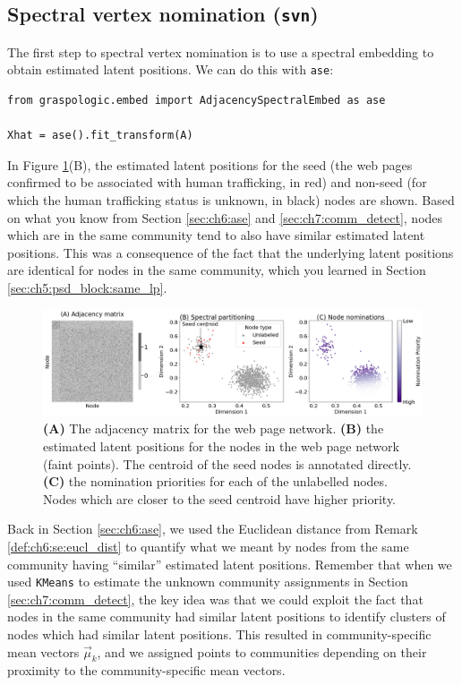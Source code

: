 \subsection{Spectral vertex nomination (\texttt{svn})}


The first step to spectral vertex nomination is to use a spectral embedding to obtain estimated latent positions. We can do this with \texttt{ase}:

\begin{lstlisting}[style=python]
from graspologic.embed import AdjacencySpectralEmbed as ase

Xhat = ase().fit_transform(A)
\end{lstlisting}

In Figure \ref{fig:ch7:vn:ex}(B), the estimated latent positions for the seed (the web pages confirmed to be associated with human trafficking, in red) and non-seed (for which the human trafficking status is unknown, in black) nodes are shown. Based on what you know from Section \ref{sec:ch6:ase} and \ref{sec:ch7:comm_detect}, nodes which are in the same community tend to also have similar estimated latent positions. This was a consequence of the fact that the underlying latent positions are identical for nodes in the same community, which you learned in Section \ref{sec:ch5:psd_block:same_lp}. 

\begin{figure}[h]
    \centering
    \includegraphics[width=\linewidth]{applications/ch7/Images/vn.png}
    \caption[Web page network for vertex nomination.]{\textbf{(A)} The adjacency matrix for the web page network. \textbf{(B)} the estimated latent positions for the nodes in the web page network (faint points). The centroid of the seed nodes is annotated directly. \textbf{(C)} the nomination priorities for each of the unlabelled nodes. Nodes which are closer to the seed centroid have higher priority.}
    \label{fig:ch7:vn:ex}
\end{figure}

Back in Section \ref{sec:ch6:ase}, we used the Euclidean distance from Remark \ref{def:ch6:se:eucl_dist} to quantify what we meant by nodes from the same community having ``similar'' estimated latent positions. Remember that when we used \texttt{KMeans} to estimate the unknown community assignments in Section \ref{sec:ch7:comm_detect}, the key idea was that we could exploit the fact that nodes in the same community had similar latent positions to identify clusters of nodes which had similar latent positions. This resulted in community-specific mean vectors $\vec \mu_k$, and we assigned points to communities depending on their proximity to the community-specific mean vectors.

